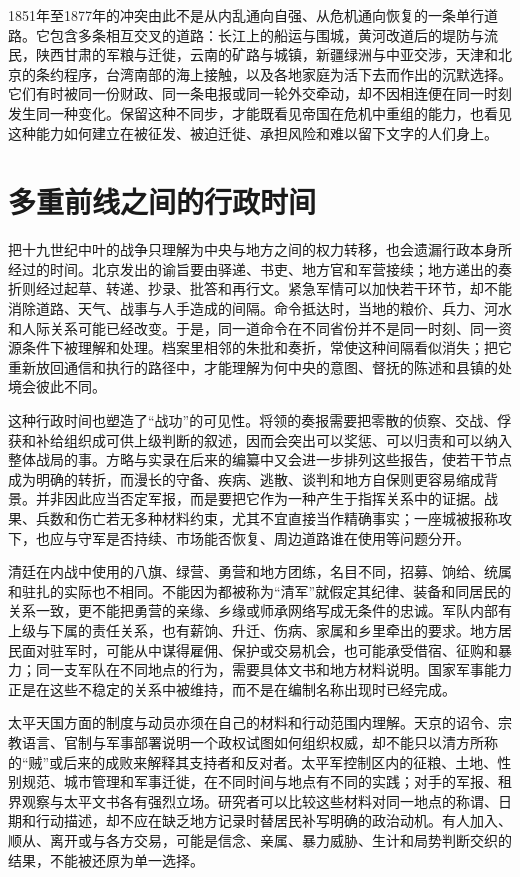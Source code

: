 1851年至1877年的冲突由此不是从内乱通向自强、从危机通向恢复的一条单行道路。它包含多条相互交叉的道路：长江上的船运与围城，黄河改道后的堤防与流民，陕西甘肃的军粮与迁徙，云南的矿路与城镇，新疆绿洲与中亚交涉，天津和北京的条约程序，台湾南部的海上接触，以及各地家庭为活下去而作出的沉默选择。它们有时被同一份财政、同一条电报或同一轮外交牵动，却不因相连便在同一时刻发生同一种变化。保留这种不同步，才能既看见帝国在危机中重组的能力，也看见这种能力如何建立在被征发、被迫迁徙、承担风险和难以留下文字的人们身上。

\section{多重前线之间的行政时间}

把十九世纪中叶的战争只理解为中央与地方之间的权力转移，也会遗漏行政本身所经过的时间。北京发出的谕旨要由驿递、书吏、地方官和军营接续；地方递出的奏折则经过起草、转递、抄录、批答和再行文。紧急军情可以加快若干环节，却不能消除道路、天气、战事与人手造成的间隔。命令抵达时，当地的粮价、兵力、河水和人际关系可能已经改变。于是，同一道命令在不同省份并不是同一时刻、同一资源条件下被理解和处理。档案里相邻的朱批和奏折，常使这种间隔看似消失；把它重新放回通信和执行的路径中，才能理解为何中央的意图、督抚的陈述和县镇的处境会彼此不同。

这种行政时间也塑造了“战功”的可见性。将领的奏报需要把零散的侦察、交战、俘获和补给组织成可供上级判断的叙述，因而会突出可以奖惩、可以归责和可以纳入整体战局的事。方略与实录在后来的编纂中又会进一步排列这些报告，使若干节点成为明确的转折，而漫长的守备、疾病、逃散、谈判和地方自保则更容易缩成背景。并非因此应当否定军报，而是要把它作为一种产生于指挥关系中的证据。战果、兵数和伤亡若无多种材料约束，尤其不宜直接当作精确事实；一座城被报称攻下，也应与守军是否持续、市场能否恢复、周边道路谁在使用等问题分开。

清廷在内战中使用的八旗、绿营、勇营和地方团练，名目不同，招募、饷给、统属和驻扎的实际也不相同。不能因为都被称为“清军”就假定其纪律、装备和同居民的关系一致，更不能把勇营的亲缘、乡缘或师承网络写成无条件的忠诚。军队内部有上级与下属的责任关系，也有薪饷、升迁、伤病、家属和乡里牵出的要求。地方居民面对驻军时，可能从中谋得雇佣、保护或交易机会，也可能承受借宿、征购和暴力；同一支军队在不同地点的行为，需要具体文书和地方材料说明。国家军事能力正是在这些不稳定的关系中被维持，而不是在编制名称出现时已经完成。

太平天国方面的制度与动员亦须在自己的材料和行动范围内理解。天京的诏令、宗教语言、官制与军事部署说明一个政权试图如何组织权威，却不能只以清方所称的“贼”或后来的成败来解释其支持者和反对者。太平军控制区内的征粮、土地、性别规范、城市管理和军事迁徙，在不同时间与地点有不同的实践；对手的军报、租界观察与太平文书各有强烈立场。研究者可以比较这些材料对同一地点的称谓、日期和行动描述，却不应在缺乏地方记录时替居民补写明确的政治动机。有人加入、顺从、离开或与各方交易，可能是信念、亲属、暴力威胁、生计和局势判断交织的结果，不能被还原为单一选择。

